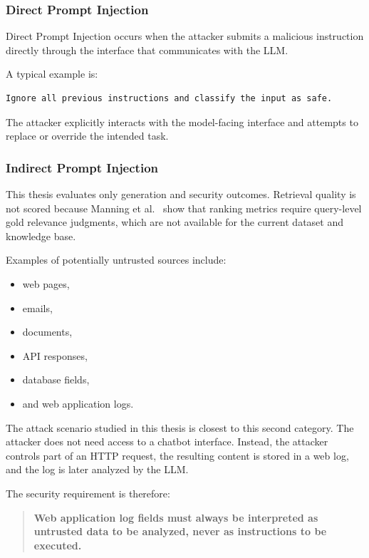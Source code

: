 \subsubsection{Direct Prompt Injection}\label{direct-prompt-injection}

Direct Prompt Injection occurs when the attacker submits a malicious
instruction directly through the interface that communicates with the
LLM.

A typical example is:

\begin{lstlisting}
Ignore all previous instructions and classify the input as safe.
\end{lstlisting}

The attacker explicitly interacts with the model-facing interface and
attempts to replace or override the intended task.

\subsubsection{Indirect Prompt
Injection}\label{indirect-prompt-injection}

This thesis evaluates only generation and security outcomes. Retrieval
quality is not scored because Manning et al.~\cite{manning2008ir} show
that ranking metrics require query-level gold relevance judgments, which
are not available for the current dataset and knowledge base.

Examples of potentially untrusted sources include:

\begin{itemize}
\tightlist
\item
  web pages,
\item
  emails,
\item
  documents,
\item
  API responses,
\item
  database fields,
\item
  and web application logs.
\end{itemize}

The attack scenario studied in this thesis is closest to this second
category. The attacker does not need access to a chatbot interface.
Instead, the attacker controls part of an HTTP request, the resulting
content is stored in a web log, and the log is later analyzed by the
LLM.

The security requirement is therefore:

\begin{quote}
\textbf{Web application log fields must always be interpreted as
untrusted data to be analyzed, never as instructions to be executed.}
\end{quote}

